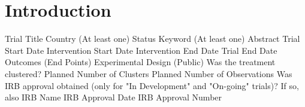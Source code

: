 \section{Introduction}\label{sec:intro}


    Trial Title
    Country (At least one)
    Status
    Keyword (At least one)
    Abstract
    Trial Start Date
    Intervention Start Date
    Intervention End Date
    Trial End Date
    Outcomes (End Points)
    Experimental Design (Public)
    Was the treatment clustered?
    Planned Number of Clusters
    Planned Number of Observations
    Was IRB approval obtained (only for "In Development" and "On-going" trials)? If so, also
        IRB Name
        IRB Approval Date
        IRB Approval Number






\clearpage
\pagebreak





